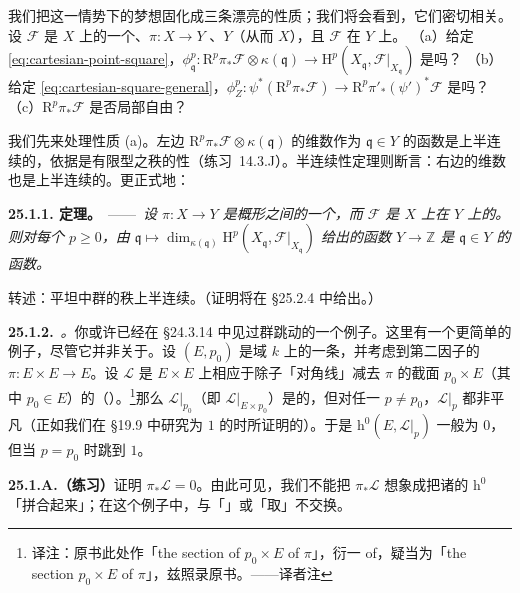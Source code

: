 我们把这一情势下的梦想固化成三条漂亮的性质；我们将会看到，它们密切相关。设 $\mathscr{F}$ 是 $X$ 上的一个\trCoherentSheaf、$\pi\colon X\to Y$ \trProper、$Y$（从而 $X$）\trNoether，且 $\mathscr{F}$ 在 $Y$ 上\trFlat。
（a）给定\trCartesianDiagram{} \eqref{eq:cartesian-point-square}，$\phi^p_{\mathfrak{q}}\colon\mathrm{R}^p\pi_*\mathscr{F}\otimes\kappa(\mathfrak{q})\to\mathrm{H}^p(X_{\mathfrak{q}},\mathscr{F}|_{X_{\mathfrak{q}}})$ 是\trIsomorphism{}吗？
（b）给定\trCartesianDiagram{} \eqref{eq:cartesian-square-general}，$\phi^p_Z\colon\psi^*(\mathrm{R}^p\pi_*\mathscr{F})\to\mathrm{R}^p\pi'_*(\psi')^*\mathscr{F}$ 是\trIsomorphism{}吗？
（c）$\mathrm{R}^p\pi_*\mathscr{F}$ 是否局部自由？

我们先来处理性质 (a)。左边 $\mathrm{R}^p\pi_*\mathscr{F}\otimes\kappa(\mathfrak{q})$ 的维数作为 $\mathfrak{q}\in Y$ 的函数是上半连续的，依据是有限型\trQCSheaf{}之秩的\trUpperSemicontinuous{}性（\mbox{练习~14.3.J}）。半连续性定理则断言：右边的维数也是上半连续的。更正式地：

\textbf{25.1.1. \trSemicontinuity{}定理。}\ ——\ \emph{设 $\pi\colon X\to Y$ 是\trNoether{}概形之间的一个\trProper\trMorphism，而 $\mathscr{F}$ 是 $X$ 上在 $Y$ 上\trFlat{}的\trCoherentSheaf。则对每个 $p\ge 0$，由 $\mathfrak{q}\mapsto\dim_{\kappa(\mathfrak{q})}\mathrm{H}^p(X_{\mathfrak{q}},\mathscr{F}|_{X_{\mathfrak{q}}})$ 给出的函数 $Y\to\mathbb{Z}$ 是 $\mathfrak{q}\in Y$ 的\trUpperSemicontinuous{}函数。}

转述：\trProper{}平坦\trFamily{}中\trCohomology{}群的秩上半连续。（证明将在 \S25.2.4 中给出。）

\textbf{25.1.2.}\ \emph{\trhExample{}。}\quad 你或许已经在 \S24.3.14 中见过\trCohomology{}群跳动的一个例子。这里有一个更简单的例子，尽管它并非关于\trStructureSheaf{}。设 $(E,p_0)$ 是域 $k$ 上的一条\trEllipticCurve，并考虑到第二因子的\trProjection{} $\pi\colon E\times E\to E$。设 $\mathscr{L}$ 是 $E\times E$ 上相应于除子「对角线」减去 $\pi$ 的截面 $p_0\times E$（其中 $p_0\in E$）的\trInvertibleSheaf（\trLineBundle）。\footnote{译注：原书此处作「the section of \(p_0\times E\) of \(\pi\)」，衍一 of，疑当为「the section \(p_0\times E\) of \(\pi\)」，兹照录原书。——译者注}那么 $\mathscr{L}|_{p_0}$（即 $\mathscr{L}|_{E\times p_0}$）是\trTrivial{}的，但对任一 $p\neq p_0$，$\mathscr{L}|_p$ 都非平凡（正如我们在 \S19.9 中研究\trGenus{}为 $1$ 的\trCurve{}时所证明的）。于是 $\mathrm{h}^0(E,\mathscr{L}|_p)$ 一般为 $0$，但当 $p=p_0$ 时跳到 $1$。

\textbf{25.1.A.（练习）}\quad 证明 $\pi_*\mathscr{L}=0$。由此可见，我们不能把 $\pi_*\mathscr{L}$ 想象成把诸\trFiber{}的 $\mathrm{h}^0$ 「拼合起来」；在这个例子中，\trCohomology{}与「\trBaseChange」或「取\trFiber」不交换。

